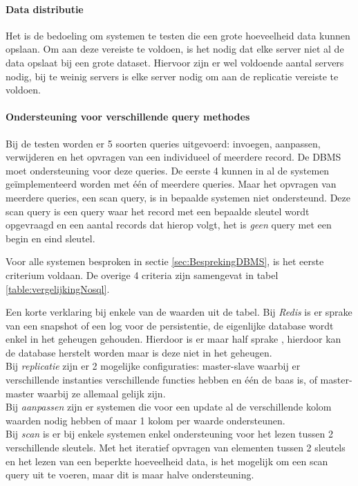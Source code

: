 \paragraph{Data distributie} Het is de bedoeling om systemen te testen die een grote hoeveelheid data kunnen opslaan. Om aan deze vereiste te voldoen, is het nodig dat elke server niet al de data opslaat bij een grote dataset. Hiervoor zijn er wel voldoende aantal servers nodig, bij te weinig servers is elke server nodig om aan de replicatie vereiste te voldoen. 

\paragraph{Ondersteuning voor verschillende query methodes} Bij de testen worden er 5 soorten queries uitgevoerd: invoegen, aanpassen, verwijderen en het opvragen van een individueel of meerdere record. De DBMS moet ondersteuning voor deze queries. De eerste 4 kunnen in al de systemen geïmplementeerd worden met één of meerdere queries. Maar het opvragen van meerdere queries, een scan query, is in bepaalde systemen niet ondersteund. Deze scan query is een query waar het record met een bepaalde sleutel wordt opgevraagd en een aantal records dat hierop volgt, het is \textit{geen} query met een begin en eind sleutel. 

Voor alle systemen besproken in sectie \ref{sec:BesprekingDBMS}, is het eerste criterium voldaan. De overige 4 criteria zijn samengevat in tabel \ref{table:vergelijkingNosql}.

Een korte verklaring bij enkele van de waarden uit de tabel. Bij \textit{Redis} is er sprake van een snapshot of een log voor de persistentie, de eigenlijke database wordt enkel in het geheugen gehouden. Hierdoor is er maar half sprake , hierdoor kan de database herstelt worden maar is deze niet in het geheugen. \\
Bij \textit{replicatie} zijn er 2 mogelijke configuraties: master-slave waarbij er verschillende instanties verschillende functies hebben en één de baas is, of master-master waarbij ze allemaal gelijk zijn. \\
Bij \textit{aanpassen} zijn er systemen die voor een update al de verschillende kolom waarden nodig hebben of maar 1 kolom per waarde ondersteunen. \\
Bij \textit{scan} is er bij enkele systemen enkel ondersteuning voor het lezen tussen 2 verschillende sleutels. Met het iteratief opvragen van elementen tussen 2 sleutels en het lezen van een beperkte hoeveelheid data, is het mogelijk om een scan query uit te voeren, maar dit is maar halve ondersteuning. 

